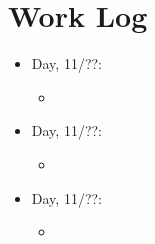 \documentclass[letterpaper,10pt,onecolumn]{IEEEtran}
\begin{document}
        \begin{center}
        \def\arraystretch{1.1}
        \begin{tabular}{ | p{8cm} | }
            \hline
            
            \hline
        \end{tabular}
        \end{center}


    
    \vspace{6mm}
    
    
    \section*{Work Log}
    
    
    \begin{itemize}
        \item Day, 11/??:
            \begin{itemize} 
                \item 
        	\end{itemize}
        \item Day, 11/??:
            \begin{itemize} 
                \item 
        	\end{itemize}
        \item Day, 11/??:
            \begin{itemize} 
                \item 
        	\end{itemize}
    \end{itemize}
    
    
    \vspace{6mm}
    
   
\end{document}
